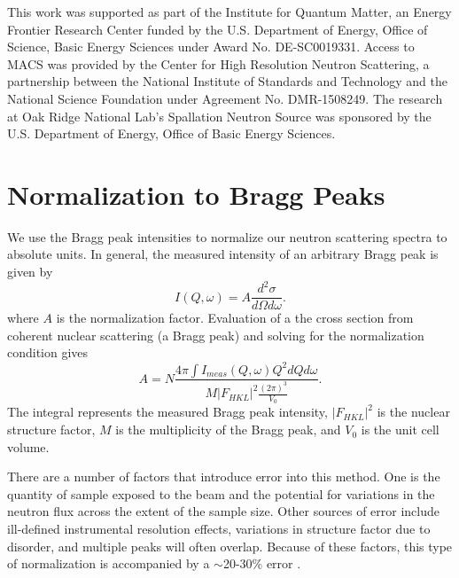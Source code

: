 \documentclass[%
 reprint,
superscriptaddress,
 amsmath,amssymb,
 aps,
 prb,
]{revtex4-2}
\begin{document}
\begin{acknowledgements}

This work was supported as part of the Institute for Quantum Matter, an Energy Frontier Research Center funded by the U.S. Department of Energy, Office of Science, Basic Energy Sciences under Award No. DE-SC0019331. Access to MACS was provided by the Center for High Resolution Neutron Scattering, a partnership between the National Institute of Standards and Technology and the National Science Foundation under Agreement No. DMR-1508249. The research at Oak Ridge National Lab's Spallation Neutron Source was sponsored by the U.S. Department of Energy, Office of Basic Energy Sciences.

\end{acknowledgements}

\appendix

\section{Normalization to Bragg Peaks}

We use the Bragg peak intensities to normalize our neutron scattering spectra to absolute units. In general, the measured intensity of an arbitrary Bragg peak is given by 
\begin{equation}
    I(Q,\omega) = A \frac{d^2\sigma}{d\Omega d\omega}.
\end{equation}
where $A$ is the normalization factor. Evaluation of a the cross section from coherent nuclear scattering (a Bragg peak) and solving for the normalization condition gives
\begin{equation}
    A=N\frac{4\pi \int I_{meas}(Q,\omega)Q^2 dQd\omega}{M|F_{HKL}|^2\frac{(2\pi)^3}{V_0}}.
    \label{NC_eq}
\end{equation}
The integral represents the measured Bragg peak intensity, $|F_{HKL}|^2$ is the nuclear structure factor, $M$ is the multiplicity of the Bragg peak, and $V_0$ is the unit cell volume. 

There are a number of factors that introduce error into this method. One is the quantity of sample exposed to the beam and the potential for variations in the neutron flux across the extent of the sample size. Other sources of error include ill-defined instrumental resolution effects, variations in structure factor due to disorder, and multiple peaks will often overlap. Because of these factors, this type of normalization is accompanied by a $\sim$20-30\% error \cite{Xu2013AbsoluteData}. 
\end{document}
